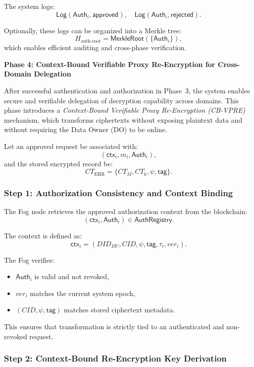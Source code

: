 \documentclass[conference]{IEEEtran}
\begin{document}
The system logs:
\[
\textsf{Log}(\mathsf{Auth}_i, \textsf{approved}),
\quad
\textsf{Log}(\mathsf{Auth}_i, \textsf{rejected}).
\]

Optionally, these logs can be organized into a Merkle tree:
\[
H_{\text{auth-root}} = \textsf{MerkleRoot}(\{\mathsf{Auth}_i\}),
\]
which enables efficient auditing and cross-phase verification.



\textbf{Phase 4: Context-Bound Verifiable Proxy Re-Encryption for Cross-Domain Delegation}
\label{sec:phase4}

After successful authentication and authorization in Phase~3, the system enables secure and verifiable delegation of decryption capability across domains. This phase introduces a \emph{Context-Bound Verifiable Proxy Re-Encryption (CB-VPRE)} mechanism, which transforms ciphertexts without exposing plaintext data and without requiring the Data Owner (DO) to be online.

Let an approved request be associated with:
\[
(\mathsf{ctx}_i, m_i, \mathsf{Auth}_i),
\]
and the stored encrypted record be:
\[
CT_{\text{EHR}} = \{CT_M, CT_k, \psi, \mathsf{tag}\}.
\]

\subsubsection*{Step 1: Authorization Consistency and Context Binding}

The Fog node retrieves the approved authorization context from the blockchain:
\[
(\mathsf{ctx}_i, \mathsf{Auth}_i) \in \textsf{AuthRegistry}.
\]

The context is defined as:
\[
\mathsf{ctx}_i = (DID_{DU}, CID, \psi, \mathsf{tag}, \tau_i, ver_i).
\]

The Fog verifies:
\begin{itemize}
    \item $\mathsf{Auth}_i$ is valid and not revoked,
    \item $ver_i$ matches the current system epoch,
    \item $(CID, \psi, \mathsf{tag})$ matches stored ciphertext metadata.
\end{itemize}

This ensures that transformation is strictly tied to an authenticated and non-revoked request.

\subsubsection*{Step 2: Context-Bound Re-Encryption Key Derivation}
\end{document}

